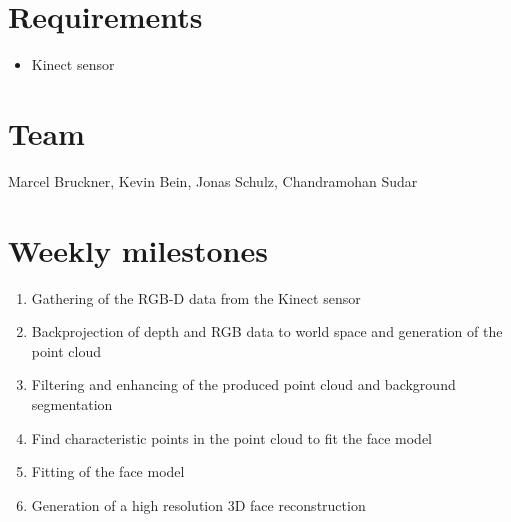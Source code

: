 \documentclass[a4paper,pagesize 10pt]{scrartcl}
\begin{document}
\section{Requirements}
\begin{itemize}	
	\item Kinect sensor
\end{itemize}

\section{Team}
Marcel Bruckner, Kevin Bein, Jonas Schulz, Chandramohan Sudar

\section{Weekly milestones}
\begin{enumerate}
	\item Gathering of the RGB-D data from the Kinect sensor
	\item Backprojection of depth and RGB data to world space and generation of the point cloud
	\item Filtering and enhancing of the produced point cloud and background segmentation
	\item Find characteristic points in the point cloud to fit the face model
	\item Fitting of the face model
	\item Generation of a high resolution 3D face reconstruction
\end{enumerate}

{\small
	
	
}
\end{document}

